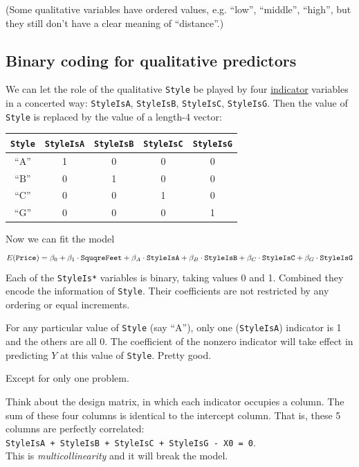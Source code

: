 \documentclass[12pt]{article}
\begin{document}
(Some qualitative variables have ordered values, e.g. ``low'',
``middle'', ``high'', but they still don't have a clear meaning of
``distance''.)



\subsection{Binary coding for qualitative predictors}

We can let the role of the qualitative \verb+Style+ be played
by four \underline{indicator} variables in a concerted way:
\verb+StyleIsA+, \verb+StyleIsB+, \verb+StyleIsC+,
\verb+StyleIsG+.
Then the value of \verb+Style+ is replaced by the value of a length-4
vector:

\begin{tabular}{c|cccc}
\verb+Style+ & \verb+StyleIsA+ & \verb+StyleIsB+ & \verb+StyleIsC+
& \verb+StyleIsG+ \\ \hline
``A'' & 1 & 0 & 0 & 0\\
``B'' & 0 & 1 & 0 & 0\\
``C'' & 0 & 0 & 1 & 0\\
``G'' & 0 & 0 & 0 & 1\\ \hline
\end{tabular}

Now we can fit the model
\[
E(\text{\tt Price})
= \beta_0
    + \beta_1\cdot \text{\tt SquqreFeet}
    + \beta_A\cdot \text{\tt StyleIsA}
    + \beta_B\cdot \text{\tt StyleIsB}
    + \beta_C\cdot \text{\tt StyleIsC}
    + \beta_G\cdot \text{\tt StyleIsG}
\]
Each of the \verb+StyleIs*+ variables is binary,
taking values 0 and 1.
Combined they encode the information of \verb+Style+.
Their coefficients are not restricted by any ordering or equal
increments.

For any particular value of \verb+Style+ (say ``A''),
only one (\verb+StyleIsA+) indicator is 1 and the others are all 0.
The coefficient of the nonzero indicator will take effect in predicting
$Y$ at this value of \verb+Style+.
Pretty good.

Except for only one problem.

Think about the design matrix, in which each indicator occupies a
column.
The sum of these four columns is identical to the intercept column.
That is, these 5 columns are perfectly correlated:\\
\verb&StyleIsA + StyleIsB + StyleIsC + StyleIsG - X0 = 0&.\\
This is \emph{multicollinearity} and it will break the model.
\end{document}
